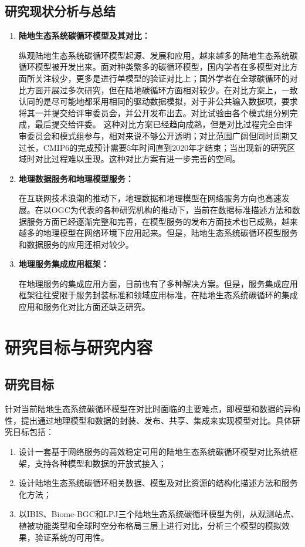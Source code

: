 \subsection{研究现状分析与总结}
\begin{enumerate}[(1)]
\item \textbf{陆地生态系统碳循环模型及其对比：}

纵观陆地生态系统碳循环模型起源、发展和应用，越来越多的陆地生态系统碳循环模型被开发出来。面对种类繁多的碳循环模型，国内学者在多模型对比方面所关注较少，更多是进行单模型的验证对比上；国外学者在全球碳循环的对比方面开展过多次研究，但在陆地碳循环方面相对较少。在对比方案上，一致认同的是尽可能地都采用相同的驱动数据模拟，对于非公共输入数据项，要求将其一并提交给评审委员会，并公开发布出去。对比试验由各个模式组分别完成，最后提交给评委。
这种对比方案已经趋向成熟，但是对比过程完全由评审委员会和模式组参与，相对来说不够公开透明；对比范围广阔但同时周期又过长，CMIP6的完成预计需要5年时间直到2020年才结束；当出现新的研究区域时对比过程难以重现。这种对比方案有进一步完善的空间。  %

\item \textbf{地理数据服务和地理模型服务：}

在互联网技术浪潮的推动下，地理数据和地理模型在网络服务方向也高速发展。在以OGC为代表的各种研究机构的推动下，当前在数据标准描述方法和数据服务方面已经逐渐完整和完善，在模型服务的发布方面技术也已成熟，越来越多的地理模型在网络环境下应用起来。但是，陆地生态系统碳循环模型服务和数据服务的应用还相对较少。

\item \textbf{地理服务集成应用框架：}

在地理服务的集成应用方面，目前也有了多种解决方案。但是，服务集成应用框架往往受限于服务封装标准和领域应用标准，在陆地生态系统碳循环的集成应用和服务化对比方面还缺乏研究。

\end{enumerate}

\section{研究目标与研究内容}
\subsection{研究目标}
针对当前陆地生态系统碳循环模型在对比时面临的主要难点，即模型和数据的异构性，提出通过地理模型和数据的封装、发布、共享、集成来实现模型对比。具体研究目标包括：
\begin{enumerate}[(1)]
    \item 设计一套基于网络服务的高效稳定可用的陆地生态系统碳循环模型对比系统框架，支持各种模型和数据的开放式接入；
    \item 设计陆地生态系统碳循环相关数据、模型及对比资源的结构化描述方法和服务化方法；
    \item 以IBIS、Biome-BGC和LPJ三个陆地生态系统碳循环模型为例，从观测站点、植被功能类型和全球时空分布格局三层上进行对比，分析三个模型的模拟效果，验证系统的可用性。
\end{enumerate}

